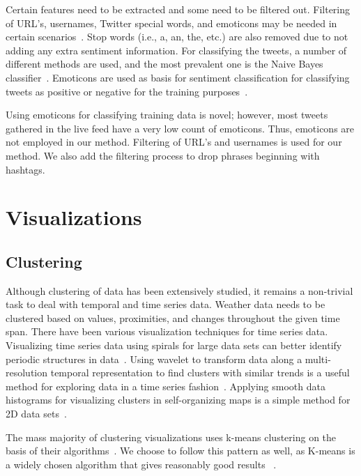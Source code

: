 Certain features need to be extracted and some need to be filtered out. Filtering of URL's, usernames, Twitter special words, and emoticons may be needed in certain scenarios~\cite{pak2010twitter}. Stop words (i.e., a, an, the, etc.) are also removed due to not adding any extra sentiment information. For classifying the tweets, a number of different methods are used, and the most prevalent one is the Naive Bayes classifier~\cite{pak2010twitter,pangthumbs}. Emoticons are used as basis for sentiment classification for classifying tweets as positive or negative for the training purposes~\cite{pak2010twitter,agarwal2011sentiment}.

Using emoticons for classifying training data is novel; however, most tweets gathered in the live feed have a very low count of emoticons. Thus, emoticons are not employed in our method. Filtering of URL's and usernames is used for our method. We also add the filtering process to drop phrases beginning with hashtags.

\section{Visualizations}

\subsection{Clustering}

Although clustering of data has been extensively studied, it remains a non-trivial task to deal with temporal and time series data. Weather data needs to be clustered based on values, proximities, and changes throughout the given time span. There have been various visualization techniques for time series data. Visualizing time series data using spirals for large data sets can better identify periodic structures in data~\cite{weber2001visualizing}. Using wavelet to transform data along a multi-resolution temporal representation to find clusters with similar trends is a useful method for exploring data in a time series fashion~\cite{woodring2009multiscale}. Applying smooth data histograms for visualizing clusters in self-organizing maps is a simple method for 2D data sets~\cite{pampalk2002using}.

The mass majority of clustering visualizations uses k-means clustering on the basis of their algorithms~\cite{weber2001visualizing,woodring2009multiscale}. We choose to follow this pattern as well, as K-means is a widely chosen algorithm that gives reasonably good results ~\cite{weber2001visualizing,jain2010data}.

